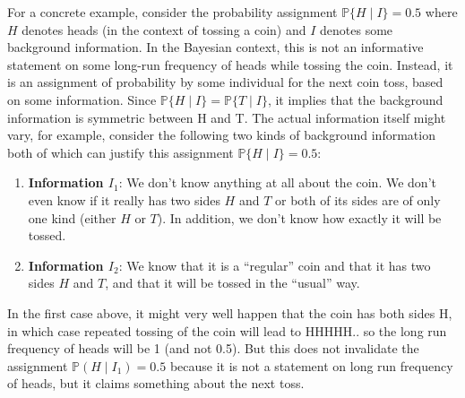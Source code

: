 \documentclass{scrartcl}
\renewcommand{\P}{{\mathbb P}}
\begin{document}
For a concrete example, consider the probability assignment $\P\{H
\mid I\} = 0.5$  where $H$ denotes heads (in the context of tossing a
coin) and $I$ denotes some background information. In the Bayesian
context, this is not an informative statement on some long-run
frequency of heads while tossing the coin. Instead, it is an
assignment of probability by some individual for the next coin toss,
based on some information. Since $\P\{H \mid I\} = \P\{T \mid I\}$, it
implies that the background information is symmetric between H and
T. The actual information itself might vary, for example, consider the
following two kinds of background information both of which can
justify this assignment $\P\{H \mid I\} = 0.5$:
\begin{enumerate}
\item \textbf{Information $I_1$}: We don't know anything at all about the
  coin. We don't even know if it really has two sides $H$ and $T$ or
  both of its sides are of only one kind (either $H$ or $T$). In
  addition, we don't know how exactly it will be tossed. 
\item \textbf{Information $I_2$}: We know that it is a ``regular'' coin
  and that it has two sides $H$ and $T$, and that it will be tossed in
  the ``usual'' way. 
\end{enumerate}
In the first case above, it might very well happen that the coin has
both sides H, in which case repeated tossing of the coin will lead to
HHHHH.. so the long run frequency of heads will be 1 (and not
0.5). But this does not invalidate the assignment $\P(H \mid I_1) =
0.5$ because it is not a statement on long run frequency of heads, but
it claims something about the next toss. 
\end{document}
